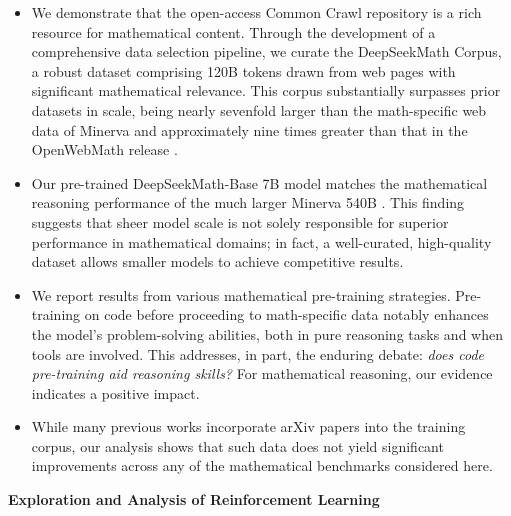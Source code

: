 \begin{itemize}[topsep=0pt]
    \item We demonstrate that the open-access Common Crawl repository is a rich resource for mathematical content. Through the development of a comprehensive data selection pipeline, we curate the DeepSeekMath Corpus, a robust dataset comprising 120B tokens drawn from web pages with significant mathematical relevance. This corpus substantially surpasses prior datasets in scale, being nearly sevenfold larger than the math-specific web data of Minerva \citep{minerva} and approximately nine times greater than that in the OpenWebMath release \citep{openwebmath}.

    \item Our pre-trained DeepSeekMath-Base 7B model matches the mathematical reasoning performance of the much larger Minerva 540B \citep{minerva}. This finding suggests that sheer model scale is not solely responsible for superior performance in mathematical domains; in fact, a well-curated, high-quality dataset allows smaller models to achieve competitive results.

    \item We report results from various mathematical pre-training strategies. Pre-training on code before proceeding to math-specific data notably enhances the model's problem-solving abilities, both in pure reasoning tasks and when tools are involved. This addresses, in part, the enduring debate: \textit{does code pre-training aid reasoning skills?} For mathematical reasoning, our evidence indicates a positive impact.

    \item While many previous works incorporate arXiv papers into the training corpus, our analysis shows that such data does not yield significant improvements across any of the mathematical benchmarks considered here.
\end{itemize}

\textbf{Exploration and Analysis of Reinforcement Learning}

